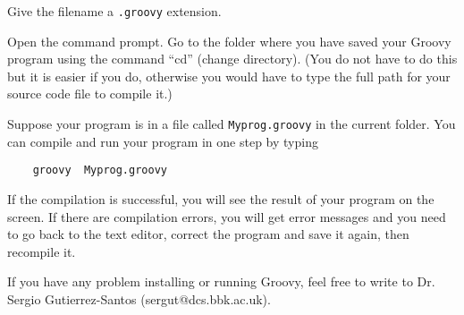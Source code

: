 Give the filename a \texttt{.groovy} extension.

Open the command prompt. 
Go to the folder where you have saved your Groovy
program using the command ``cd'' (change directory). (You do not have to
do this but it is easier if you do, otherwise you would have to type the full
path for your source code file to compile it.)

Suppose your program is in a file called 
\texttt{Myprog.groovy} in the current folder. 
You can compile and run your program in one step by typing 

\begin{Verbatim}
    groovy  Myprog.groovy
\end{Verbatim}

If the compilation is successful, you will see the result of your
program on the screen.
%
If there are compilation errors, you will get error messages and you need
to go back to the text editor, correct the program and save it again,
then recompile it. 

If you have any problem installing or running Groovy, feel free to
write to Dr. Sergio Gutierrez-Santos (sergut@dcs.bbk.ac.uk).




